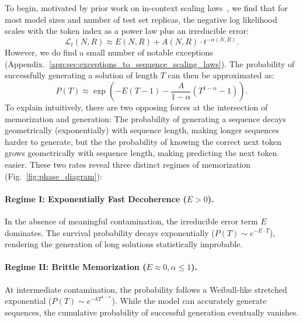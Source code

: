 To begin, motivated by prior work on in-context scaling laws~\citep{anthropic2023claude2,geminiteam2024gemini15unlockingmultimodal,xiong2024effective,anil2024many}, we find that for most model sizes and number of test set replicas, the negative log likelihood scales with the token index as a power law plus an irreducible error:
%
\begin{equation}\label{eqn:in_context_scaling_law}
    \mathcal{L}_t(N, R) \approx E(N, R) + A(N, R) \cdot t^{-\alpha(N, R)}.
\end{equation}
%
%
However, we do find a small number of notable exceptions (Appendix.~\ref{app:sec:exceptions_to_sequence_scaling_laws}).
The probability of successfully generating a solution of length $T$ can then be approximated as:
%
\begin{equation}
    \label{eq:survival_prob}
    P(T) \approx \exp\left( -E(T-1) - \frac{A}{1-\alpha}(T^{1-\alpha} - 1) \right).
\end{equation}
%
To explain intuitively, there are two opposing forces at the intersection of memorization and generation: The probability of generating a sequence decays geometrically (exponentially) with sequence length, making longer sequences harder to generate, but the the probability of knowing the correct next token grows geometrically with sequence length, making predicting the next token easier.
These two rates reveal three distinct regimes of memorization (Fig.~\ref{fig:phase_diagram}):



\paragraph{Regime I: Exponentially Fast Decoherence ($E > 0$).}
In the absence of meaningful contamination, the irreducible error term $E$ dominates. The survival probability decays exponentially ($P(T) \sim e^{-E \cdot T}$), rendering the generation of long solutions statistically improbable.

\paragraph{Regime II: Brittle Memorization ($E \approx 0, \alpha \le 1$).}
At intermediate contamination, the probability follows a Weibull-like stretched exponential ($P(T) \sim e^{-k T^{1-\alpha}}$). While the model can accurately generate sequences, the cumulative probability of successful generation eventually vanishes.

